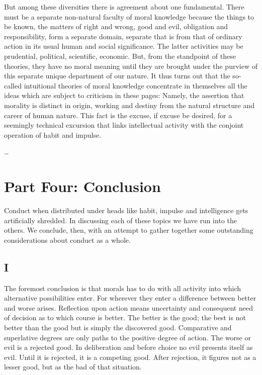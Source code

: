 \documentclass[12pt]{article}
\begin{document}
But among these diversities there is agreement about
one fundamental. There must be a separate non-natural
faculty of moral knowledge because the things
to be known, the matters of right and wrong, good and
evil, obligation and responsibility, form a separate domain,
separate that is from that of ordinary action in
its usual human and social significance. The latter activities
may be prudential, political, scientific, economic.
But, from the standpoint of these theories, they have
no moral meaning until they are brought under the
purview of this separate unique department of our
nature. It thus turns out that the so-called intuitional
theories of moral knowledge concentrate in themselves
all the ideas which are subject to criticism in these
pages: Namely, the assertion that morality is distinct
in origin, working and destiny from the natural structure
and career of human nature. This fact is the excuse,
if excuse be desired, for a seemingly technical
excursion that links intellectual activity with the conjoint
operation of habit and impulse.

\bigskip
\centerline{\ldots}

\section*{Part Four: Conclusion}

Conduct when distributed under heads like habit, impulse
and intelligence gets artificially shredded. In
discussing each of these topics we have run into the
others. We conclude, then, with an attempt to gather
together some outstanding considerations about conduct
as a whole.

\subsection*{I}

The foremost conclusion is that morals has to do
with all activity into which alternative possibilities
enter. For wherever they enter a difference between
better and worse arises. Reflection upon action means
uncertainty and consequent need of decision as to which
course is better. The better is the good; the best is
not better than the good but is simply the discovered
good. Comparative and superlative degrees are only
paths to the positive degree of action. The worse or
evil is a rejected good. In deliberation and before
choice no evil presents itself as evil. Until it is rejected,
it is a competing good. After rejection, it figures not
as a lesser good, but as the bad of that situation.
\end{document}

